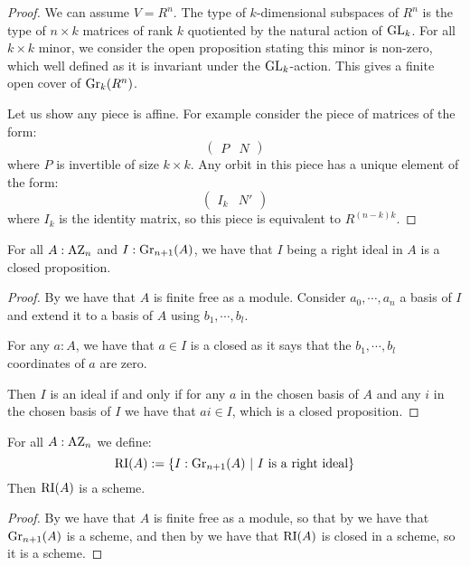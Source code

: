 \begin{proof}
We can assume $V=R^n$. The type of $k$-dimensional subspaces of $R^n$ is the type of $n\times k$ matrices of rank $k$ quotiented by the natural action of $\operatorname{GL}_k$. For all $k\times k$ minor, we consider the open proposition stating this minor is non-zero, which well defined as it is invariant under the $\operatorname{GL}_k$-action. This gives a finite open cover of $\mathrm{Gr}_k(R^n)$.

Let us show any piece is affine. For example consider the piece of matrices of the form:
\[\begin{pmatrix}
P & N
\end{pmatrix}\]
where $P$ is invertible of size $k\times k$. Any orbit in this piece has a unique element of the form:
\[\begin{pmatrix}
I_k & N'
\end{pmatrix}\]
where $I_k$ is the identity matrix, so this piece is equivalent to $R^{(n-k)k}$.
\end{proof}

\begin{lemma}\label{being-ideal-in-azumaya-closed}
For all $A:\mathrm{AZ}_n$ and $I:\mathrm{Gr}_{n+1}(A)$, we have that $I$ being a right ideal in $A$ is a closed proposition.
\end{lemma}

\begin{proof}
By  we have that $A$ is finite free as a module. Consider $a_0,\cdots,a_n$ a basis of $I$ and extend it to a basis of $A$ using $b_1,\cdots,b_l$. 

For any $a:A$, we have that $a\in I$ is a closed as it says that the $b_1,\cdots,b_l$ coordinates of $a$ are zero. 

Then $I$ is an ideal if and only if for any $a$ in the chosen basis of $A$ and any $i$ in the chosen basis of $I$ we have that $ai\in I$, which is a closed proposition.
\end{proof}

\begin{lemma}\label{severi-brauer-are-schemes}
For all $A:\mathrm{AZ}_n$ we define:
\[\RI(A) := \{I:\Gr_{n+1}(A)\ |\ I\ \mathrm{is\ a\ right\ ideal}\}\]
Then $\mathrm{RI}(A)$ is a scheme.
\end{lemma}

\begin{proof}
By  we have that $A$ is finite free as a module, so that by  we have that $\mathrm{Gr}_{n+1}(A)$ is a scheme, and then by  we have that $\mathrm{RI}(A)$ is closed in a scheme, so it is a scheme.
\end{proof}


